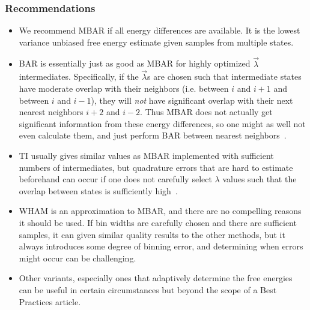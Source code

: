 \documentclass[9pt,bestpractices]{livecoms}
\begin{document}
\subsubsection{Recommendations}
\begin{itemize}
\item We recommend MBAR if all energy differences are available. It is the lowest variance unbiased free energy estimate given samples from multiple states.
\item BAR is essentially just as good as MBAR for highly optimized $\vec{\lambda}$ intermediates. Specifically, if the $\vec{\lambda}$s are chosen such that intermediate states have moderate overlap with their neighbors (i.e. between $i$ and $i+1$ and between $i$ and $i-1$), they will \textit{not} have significant overlap with their next nearest neighbors $i+2$ and $i-2$. Thus MBAR does not actually get significant information from these energy differences, so one might as well not even calculate them, and just perform BAR between nearest neighbors~\cite{paliwal2011benchmark}. 
\item TI usually gives similar values as MBAR implemented with sufficient numbers of intermediates, but quadrature errors that are hard to estimate beforehand  can occur if one does not carefully select $\lambda$ values such that the overlap between states is sufficiently high~\cite{paliwal2011benchmark}.
\item WHAM is an approximation to MBAR, and there are no compelling reasons it should be used. If bin widths are carefully chosen and there are sufficient samples, it can given similar quality results to the other methods, but it always introduces some degree of binning error, and determining when errors might occur can be challenging. 
\item Other variants, especially ones that adaptively determine the free energies can be useful in certain circumstances but beyond the scope of a Best Practices article.
\end{itemize}
\end{document}
